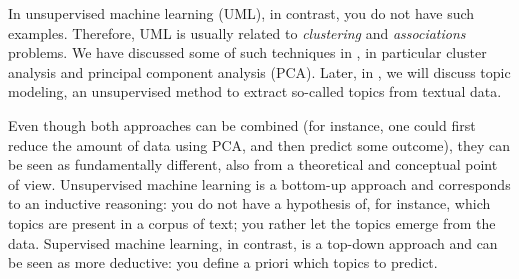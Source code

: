 In unsupervised machine learning (UML), in contrast, you do not have such
examples. Therefore, UML is usually related to \textit{clustering} and \textit{associations} problems. We have discussed some of such techniques in , in particular cluster analysis and
principal component analysis (PCA).
Later, in , we will discuss topic modeling, an unsupervised method to extract so-called topics from textual data.



Even though both approaches can be combined (for instance, one could
first reduce the amount of data using PCA, and then predict some
outcome), they can be seen as fundamentally different, also from a
theoretical and conceptual point of view.  Unsupervised machine
learning is a bottom-up approach and corresponds to an inductive
reasoning: you do not have a hypothesis of, for instance, which topics
are present in a corpus of text; you rather let the topics emerge from
the data.  Supervised machine learning, in contrast, is a top-down
approach and can be seen as more deductive: you define a priori which
topics to predict.









